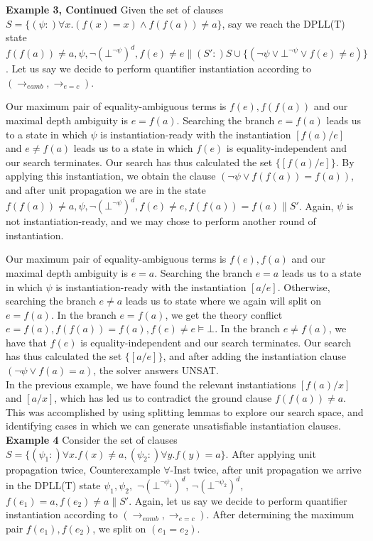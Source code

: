 \documentclass{llncs}
\begin{document}
{\bf Example 3, Continued}
Given the set of clauses $S = \{ (\psi :)\forall x. (f( x ) = x) \wedge f( f( a ) ) \neq a \}$, say we reach the DPLL(T) state $f( f( a ) ) \neq a, \psi, \neg (\bot^{\neg \psi})^d, f(e) \neq e \parallel (S':)S \cup \{ ( \neg \psi \vee \bot^{\neg \psi } \vee f( e ) \neq e ) \}$.
Let us say we decide to perform quantifier instantiation according to $( \rightarrow_{eamb}, \rightarrow_{e=c} )$.

Our maximum pair of equality-ambiguous terms is $f( e ), f( f( a ) )$ and our maximal depth ambiguity is $e = f( a )$.
Searching the branch $e = f( a )$ leads us to a state in which $\psi$ is instantiation-ready with the instantiation $[f(a)/e]$ and $e \neq f( a )$ leads us to a state in which $f( e )$ is equality-independent and our search terminates.
Our search has thus calculated the set $\{ [f(a)/e] \}$.
By applying this instantiation, we obtain the clause $( \neg \psi \vee f( f( a ) ) = f( a ) )$, and after unit propagation we are in the state $f( f( a ) ) \neq a, \psi, \neg (\bot^{\neg \psi})^d, f(e) \neq e, f( f( a ) ) = f( a ) \parallel S'$.
Again, $\psi$ is not instantiation-ready, and we may chose to perform another round of instantiation.

Our maximum pair of equality-ambiguous terms is $f( e ), f( a )$ and our maximal depth ambiguity is $e = a$.
Searching the branch $e = a$ leads us to a state in which $\psi$ is instantiation-ready with the instantiation $[a/e]$.
Otherwise, searching the branch $e \neq a$ leads us to state where we again will split on $e = f( a )$.
In the branch $e = f( a )$, we get the theory conflict $e = f( a ), f( f( a ) ) = f( a ), f( e ) \neq e \models \bot$.
In the branch $e \neq f( a )$, we have that $f( e )$ is equality-independent and our search terminates.
Our search has thus calculated the set $\{ [a/e] \}$, and after adding the instantiation clause $( \neg \psi \vee f( a ) = a )$, the solver answers UNSAT. \\

In the previous example, we have found the relevant instantiations $[f(a)/x]$ and $[a/x]$, which has led us to contradict the ground clause $f( f( a ) ) \neq a$.
This was accomplished by using splitting lemmas to explore our search space, and identifying cases in which we can generate unsatisfiable instantiation clauses. \\

{\bf Example 4}
Consider the set of clauses $S = \{ (\psi_1 :)\forall x. f(x) \neq a, (\psi_2 :)\forall y. f(y) = a \}$.
After applying unit propagation twice, Counterexample $\forall$-Inst twice, after unit propagation we arrive in the DPLL(T) state $\psi_1, \psi_2,$ $\neg (\bot^{\neg \psi_1})^d$, $\neg (\bot^{\neg \psi_2})^d$, $f(e_1) = a, f(e_2) \neq a \parallel S'$.
Again, let us say we decide to perform quantifier instantiation according to $( \rightarrow_{eamb}, \rightarrow_{e=c} )$.
After determining the maximum pair $f(e_1),f(e_2)$, we split on $( e_1 = e_2 )$.
\end{document}
